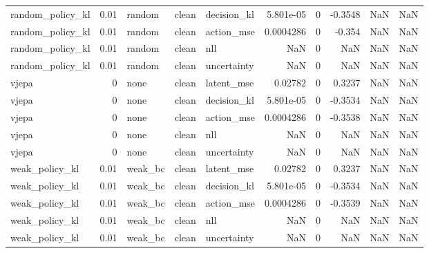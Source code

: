 \begin{tabular}{lrlllrrrrr}
random\_policy\_kl & 0.01 & random & clean & decision\_kl & 5.801e-05 & 0 & -0.3548 & NaN & NaN \\
random\_policy\_kl & 0.01 & random & clean & action\_mse & 0.0004286 & 0 & -0.354 & NaN & NaN \\
random\_policy\_kl & 0.01 & random & clean & nll & NaN & 0 & NaN & NaN & NaN \\
random\_policy\_kl & 0.01 & random & clean & uncertainty & NaN & 0 & NaN & NaN & NaN \\
vjepa & 0 & none & clean & latent\_mse & 0.02782 & 0 & 0.3237 & NaN & NaN \\
vjepa & 0 & none & clean & decision\_kl & 5.801e-05 & 0 & -0.3534 & NaN & NaN \\
vjepa & 0 & none & clean & action\_mse & 0.0004286 & 0 & -0.3538 & NaN & NaN \\
vjepa & 0 & none & clean & nll & NaN & 0 & NaN & NaN & NaN \\
vjepa & 0 & none & clean & uncertainty & NaN & 0 & NaN & NaN & NaN \\
weak\_policy\_kl & 0.01 & weak\_bc & clean & latent\_mse & 0.02782 & 0 & 0.3237 & NaN & NaN \\
weak\_policy\_kl & 0.01 & weak\_bc & clean & decision\_kl & 5.801e-05 & 0 & -0.3534 & NaN & NaN \\
weak\_policy\_kl & 0.01 & weak\_bc & clean & action\_mse & 0.0004286 & 0 & -0.3539 & NaN & NaN \\
weak\_policy\_kl & 0.01 & weak\_bc & clean & nll & NaN & 0 & NaN & NaN & NaN \\
weak\_policy\_kl & 0.01 & weak\_bc & clean & uncertainty & NaN & 0 & NaN & NaN & NaN \\
\bottomrule
\end{tabular}
